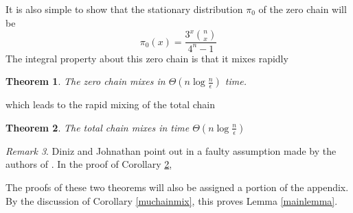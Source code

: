 \documentclass[12pt]{amsart}
\newtheorem{theorem}{Theorem}[section]
\theoremstyle{definition}
\theoremstyle{remark}
\newtheorem{remark}[theorem]{Remark}
\numberwithin{equation}{section}
\theoremstyle{remark}
\begin{document}
%
\noindent It is also simple to show that the stationary distribution $\pi_0$ of the zero chain will be
%
\begin{equation}
    \pi_0(x) = \frac{3^x{n \choose x}}{4^n - 1}
\end{equation}
%
The integral property about this zero chain is that it mixes rapidly
%
\begin{theorem} \label{zerochainmixing}
  The zero chain mixes in $\Theta(n\log\frac{n}{\epsilon})$ time.
\end{theorem}
%
\noindent which leads to the rapid mixing of the total chain
\begin{theorem} \label{totalchainmixing}
  The total chain mixes in time $\Theta(n \log\frac{n}{\epsilon})$
\end{theorem}
\begin{remark}
  Diniz and Johnathan point out in \cite{diniz} a faulty assumption made by the authors of \cite{harrlow}. In the proof of Corollary \ref{totalchainmixing},
\end{remark}
The proofs of these two theorems will also be assigned a portion of the appendix.
By the discussion of Corollary \ref{muchainmix}, this proves Lemma \ref{mainlemma}.








\end{document}
